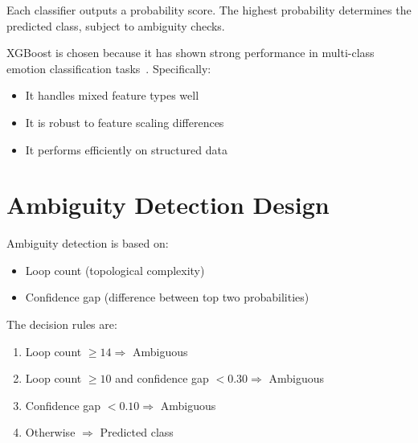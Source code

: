 Each classifier outputs a probability score. The highest probability determines the predicted
class, subject to ambiguity checks.

XGBoost is chosen because it has shown strong performance in multi-class emotion
classification tasks~\cite{xgboost_eeg}. Specifically:
\begin{itemize}
    \item It handles mixed feature types well
    \item It is robust to feature scaling differences
    \item It performs efficiently on structured data
\end{itemize}

\section{Ambiguity Detection Design}

Ambiguity detection is based on:
\begin{itemize}
    \item Loop count (topological complexity)
    \item Confidence gap (difference between top two probabilities)
\end{itemize}

The decision rules are:
\begin{enumerate}
    \item Loop count $\geq 14 \Rightarrow$ Ambiguous
    \item Loop count $\geq 10$ and confidence gap $< 0.30 \Rightarrow$ Ambiguous
    \item Confidence gap $< 0.10 \Rightarrow$ Ambiguous
    \item Otherwise $\Rightarrow$ Predicted class
\end{enumerate}

